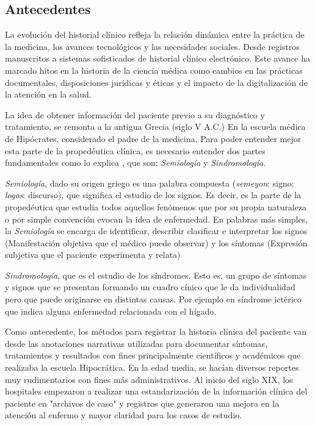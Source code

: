     \subsection{Antecedentes}
    La evolución del historial clínico refleja la relación dinámica entre la práctica de la medicina, los avances tecnológicos y las necesidades sociales. Desde registros manuscritos a sistemas sofisticados de historial clínico electrónico. Este avance ha marcado hitos en la historia de la ciencia médica como cambios en las prácticas documentales, disposiciones jurídicas y éticas y el impacto de la digitalización de la atención en la salud.

    La idea de obtener información del paciente previo a su diagnóstico y tratamiento, se remonta a la antigua Grecia (siglo V A.C.) En la escuela médica de Hipócrates, considerado el padre de la medicina. Para poder entender mejor esta parte de la propedéutica clínica, es necesario entender dos partes fundamentales como lo explica \cite{llanio_navarro_propedeutica_2007}, que son: \textit{Semiología} y \textit{Sindromología}.
  
    \textit{Semiología}, dado su origen griego es una palabra compuesta (\textit{semeyon}: signo; \textit{logos}: discurso), que significa el estudio de los signos. Es decir, es la parte de la propedéutica que estudia todos aquellos fenómenos que por su propia naturaleza o por simple convención evocan la idea de enfermedad. En palabras más simples, la \textit{Semiología} se encarga de identificar, describir clasificar e interpretar los signos (Manifestación objetiva que el médico puede observar) y los síntomas (Expresión subjetiva que el paciente experimenta y relata)
    
    \textit{Sindromología}, que es el estudio de los síndromes. Esto es, un grupo de síntomas y signos que se presentan formando un cuadro cínico que le da individualidad pero que puede originarse en distintas causas. Por ejemplo en síndrome ictérico que indica alguna enfermedad relacionada con el hígado.

   Como antecedente, los métodos para registrar la historia clínica del paciente van desde las anotaciones narrativas utilizadas para documentar síntomas, tratamientos y resultados con fines principalmente científicos y académicos que realizaba la escuela Hipocrática. En la edad media, se hacían diversos reportes muy rudimentarios con fines más administrativos. Al inicio del siglo XIX, los hospitales empezaron a realizar una estandarización de la información clínica del paciente en "archivos de caso" y registros que generaron una mejora en la atención al enfermo y mayor claridad para los casos de estudio.

